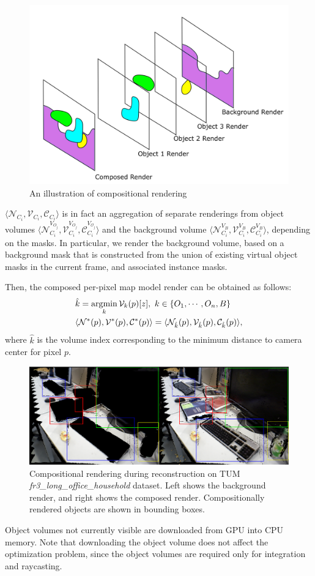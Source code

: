 \begin{figure}[htpb]
    \centering
    \includegraphics[width=0.8\linewidth]{figs/comp-render.png}
    \caption{An illustration of compositional rendering}%
    \label{fig:comp-render}
\end{figure}

\(\langle \mathcal{N}_{C_i}, \mathcal{V}_{C_i}, \mathcal{C}_{C_i} \rangle \) is in fact an aggregation of separate renderings from object volumes \(\langle \mathcal{N}_{C_i}^{V_{{O}_j}}, \mathcal{V}_{C_i}^{V_{{O}_j}}, \mathcal{C}_{C_i}^{V_{\mathcal{O}_j}} \rangle \) and the background volume \(\langle \mathcal{N}_{C_i}^{V_{B}}, \mathcal{V}_{C_i}^{V_{B}}, \mathcal{C}_{C_i}^{V_{{B}}}  \rangle \), depending on the masks. In particular, we render the background volume, based on a background mask that is constructed from the union of existing virtual object masks in the current frame, and associated instance masks.

Then, the composed per-pixel map model render can be obtained as follows:
\begin{align}
    &\hat{k} = \operatorname*{\arg\!\min}_k \mathcal{V}_k(p)[z], ~k \in \{O_1, \cdots, O_n, B\} \\
    &\langle \mathcal{N}^*(p), \mathcal{V}^*(p), \mathcal{C}^*(p) \rangle = \langle  \mathcal{N}_{\hat{k}}(p), \mathcal{V}_{\hat{k}}(p), \mathcal{C}_{\hat{k}}(p) \rangle,
\end{align}
where $\hat{k}$ is the volume index corresponding to the minimum distance to camera center for pixel $p$.

\begin{figure}[htpb]
    \centering
    \includegraphics[width=\linewidth]{figs/compositional-render.pdf}
    \caption{Compositional rendering during reconstruction on TUM \textit{fr3\_long\_office\_household} dataset. Left shows the background render, and right shows the composed render. Compositionally rendered objects are shown in bounding boxes.}
    \label{fig:compositional_render}
\end{figure}

Object volumes not currently visible are downloaded from GPU into CPU memory. Note that downloading the object volume does not affect the optimization problem, since the object volumes are required only for integration and raycasting.
